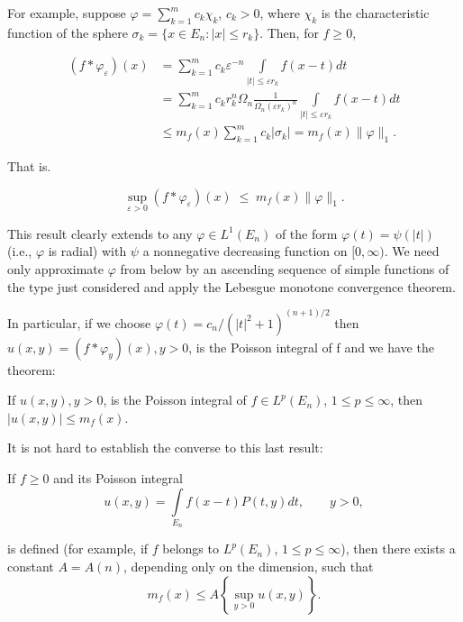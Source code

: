 For example, suppose $\varphi = \sum_{k=1}^{m} c_k \chi_k$, $c_k > 0$, where $\chi_k$ is the characteristic function of the sphere $\sigma_k = \{x \in E_n: |x| \leq r_k\}$. Then, for $f \geq 0$,

\[
\begin{aligned}(f*\varphi_\varepsilon)(x)&=\sum_{k=1}^{m} c_{k}\varepsilon^{-n}\int\limits_{|t|\leq\varepsilon r_{k}}f(x-t)dt\\&=\sum_{k=1}^{m} c_{k} r_{k}^{n}\Omega_{n}\frac{1}{\Omega_{n}(\varepsilon r_{k})^{n}}\int\limits_{|t|\leq\varepsilon r_{k}}f(x-t)dt\\&\leq m_{f}(x)\sum_{k=1}^{m} c_{k}|\sigma_{k}|=m_{f}(x)\|\varphi\|_{1}.\end{aligned}
\]

That is.

\begin{equation}\label{eq:c2-3-9}
\sup_{\varepsilon>0}(f*\varphi_{\varepsilon})(x)\;\leq\;m_{f}(x)\|\varphi\|_{1}.
\end{equation}

This result clearly extends to any $\varphi \in L^1(E_n)$ of the form $\varphi(t) = \psi(|t|)$ (i.e., $\varphi$ is radial) with $\psi$ a nonnegative decreasing function on $[0, \infty)$. We need only approximate $\varphi$ from below by an ascending sequence of simple functions of the type just considered and apply the Lebesgue monotone convergence theorem.

In particular, if we choose $\varphi(t) = c_n/(|t|^2 + 1)^{(n+1)/2}$ then $u(x, y) = (f * \varphi_y)(x), y > 0$, is the Poisson integral of f and we have the theorem:

\begin{theorem}
\label{thm:c2-3-10}
If $u(x, y), y > 0$, is the Poisson integral of $f \in L^{p}(E_{n})$, $1 \leq p \leq \infty$, then $|u(x, y)| \leq m_{f}(x)$.
\end{theorem}

It is not hard to establish the converse to this last result:

\begin{theorem}
\label{thm:c2-3-11}
If $f \geq 0$ and its Poisson integral
\[
u(x,y)=\int\limits_{E_{n}}f(x-t)P(t,y)dt,\qquad y>0,
\]

is defined (for example, if $f$ belongs to $L^p(E_n)$, $1 \leq p \leq \infty$), then there exists a constant $A = A(n)$, depending only on the dimension, such that
\[
m_{f}(x)\leq A\left\{\sup_{y>0}u(x,y)\right\}.
\]

\end{theorem}

